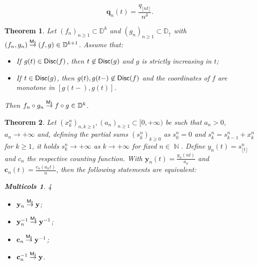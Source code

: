 \documentclass[10pt,a4paper]{amsart}
\newtheorem{thm}{Theorem}
\newtheorem{multicols}{Multicols}
\DeclareMathOperator{\N}{\mathbb{N}}
\begin{document}
\begin{equation}\label{eq:scalingqn}
	\mathbf{q}_n(t)=\frac{q_{\lfloor nt \rfloor}}{n^\delta}.
\end{equation}

\begin{thm}\label{thm:contcomp}
	Let $(f_n)_{n \ge 1}\subset \mathbb{D}^k$ and $(g_n)_{n \ge 1}\subset \mathbb{D}_{\uparrow}$ with $(f_n,g_n) \overset{\sf M_1}{\to} (f,g) \in \mathbb{D}^{k+1}$. Assume that:
	\begin{itemize}
		\item[$(i)$] If $g(t) \in {\sf Disc}(f)$, then $t \not \in {\sf Disc}(g)$ and $g$ is strictly increasing in $t$;
		\item[$(ii)$] If $t \in {\sf Disc}(g)$, then $g(t),g(t-)\not \in {\sf Disc}(f)$ and the coordinates of $f$ are monotone in $[g(t-),g(t)]$. 
	\end{itemize}
	Then $f_n \circ g_n \overset{\sf M_1}{\to}f \circ g \in \mathbb{D}^k$.
\end{thm}

\begin{thm}\label{thm:contcounting}
	Let $(x_k^n)_{n,k \ge 1},(a_n)_{n \ge 1}\subset [0,+\infty)$ be such that $a_n>0$, $a_n \to +\infty$ and, defining the partial sums $(s_k^n)_{k \ge 0}$ as $s_0^n=0$ and $s_k^n=s_{k-1}^n+x_k^n$ for $k \ge 1$,
	it holds $s_k^n \to +\infty$ as $k \to +\infty$ for fixed $n \in \N$. Define $y_n(t)=s_{\lfloor t \rfloor}^n$ and $c_n$ the respective counting function. With $\mathbf{y}_n(t)=\frac{y_n(nt)}{a_n}$ and $\mathbf{c}_n(t)=\frac{c_n(a_nt)}{n}$, then the following statements are equivalent:
	\setlength{\columnsep}{3pt}
	\begin{multicols}{4}
		\begin{itemize}
			\item[$(i)$] $\mathbf{y}_n \overset{\sf M_1}{\to} \mathbf{y}$;
			\item[$(ii)$] $\mathbf{y}_n^{-1} \overset{\sf M_1}{\to} \mathbf{y}^{-1}$;
			\item[$(iii)$] $\mathbf{c}_n \overset{\sf M_1}{\to} \mathbf{y}^{-1}$;
			\item[$(iv)$] $\mathbf{c}_n^{-1}\overset{\sf M_1}{\to}\mathbf{y}$.
		\end{itemize}
	\end{multicols}
	\setlength{\columnsep}{10pt}
\end{thm}
\end{document}
